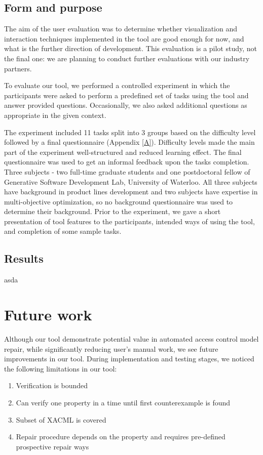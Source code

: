 \documentclass{acm_proc_article-sp}
\begin{document}
\subsection{Form and purpose}

The aim of the user evaluation was to determine whether visualization and interaction techniques implemented in the tool are good enough for now, and what is the further direction of development. This evaluation is a pilot study, not the final one: we are planning to conduct further evaluations with our industry partners.

To evaluate our tool, we performed a controlled experiment in which the participants were asked to perform a predefined set of tasks using the tool and answer provided questions. Occasionally, we also asked additional questions as appropriate in the given context.

The experiment included 11 tasks split into 3 groups based on the difficulty level followed by a final questionnaire (Appendix \ref{A}). Difficulty levels made the main part of the experiment well-structured and reduced learning effect. The final questionnaire was used to get an informal feedback upon the tasks completion. Three subjects - two full-time graduate students and one postdoctoral fellow of Generative Software Development Lab, University of Waterloo. All three subjects have background in product lines development and two subjects have expertise in multi-objective optimization, so no background questionnaire was used to determine their background. Prior to the experiment, we gave a short presentation of tool features to the participants, intended ways of using the tool, and completion of some sample tasks.

\subsection{Results}
asda


\section{Future work}

Although our tool demonstrate potential value in automated access control model repair, while significantly reducing user's manual work, we see future improvements in our tool. During implementation and testing stages, we noticed the following limitations in our tool:

\begin{enumerate}
\item Verification is bounded
\item Can verify one property in a time until first counterexample is found
\item Subset of XACML is covered
\item Repair procedure depends on the property and requires pre-defined prospective repair ways
\end{enumerate}
\end{document}
